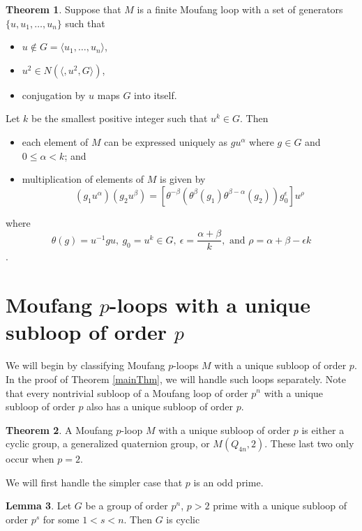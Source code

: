 \documentclass[12pt]{report}
\theoremstyle{definition}
\newtheorem{thm}{Theorem}[chapter]
\newtheorem{lem}[thm]{Lemma}
\begin{document}
\begin{thm}\label{thm-chein}
  Suppose that $M$ is a finite Moufang loop with a set of generators $\{u, u_1, \ldots, u_n\}$ such that
  \begin{itemize}
    \item $u\notin G = \langle u_1,\ldots, u_n\rangle$,
    \item $u^2\in N(\langle, u^2, G\rangle)$,
    \item conjugation by $u$ maps $G$ into itself.
  \end{itemize}
  Let $k$ be the smallest positive integer such that $u^k\in G$. Then
  \begin{itemize}
    \item each element of $M$ can be expressed uniquely as $gu^\alpha$ where $g\in G$ and $0\leq \alpha < k$; and
    \item multiplication of elements of $M$ is given by
    \[(g_1u^\alpha)(g_2u^\beta) = [\theta^{-\beta}(\theta^\beta(g_1)\theta^{\beta - \alpha}(g_2))g_0^\epsilon]u^\rho\]
  \end{itemize}
  where
  \[\theta(g) = u^{-1}gu,\: g_0 = u^k\in G,\: \epsilon = \frac{\alpha + \beta}{k},\text{ and }
    \rho = \alpha + \beta - \epsilon k\] \cite{Chein}.
\end{thm}


\section{Moufang $p$-loops with a unique subloop of order $p$}

We will begin by classifying Moufang $p$-loops $M$ with a unique subloop of order $p$. In the proof of
  Theorem \ref{mainThm}, we will handle such loops separately. Note that every nontrivial subloop of a
  Moufang loop of order $p^n$ with a unique subloop of order $p$ also has a unique subloop of order $p$.

\begin{thm}\label{moufangDesc}
    A Moufang $p$-loop $M$ with a unique subloop of order $p$ is either a cyclic group, a generalized
      quaternion group, or $M(Q_{4n}, 2)$. These last two only occur when $p = 2$.
\end{thm}

We will first handle the simpler case that $p$ is an odd prime.

\begin{lem}\label{lem-burnside}
  Let $G$ be a group of order $p^n$, $p > 2$ prime with a unique subloop of order $p^s$ for some $1 < s < n$.
    Then $G$ is cyclic \cite{Burnside}
\end{lem}
\end{document}
